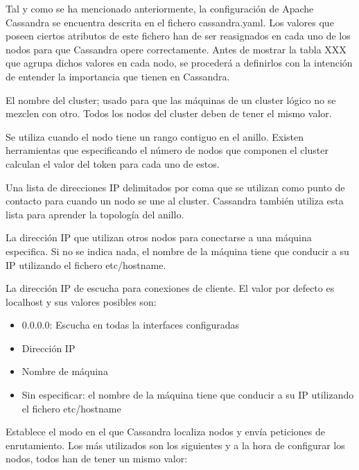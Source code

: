 Tal y como se ha mencionado anteriormente, la configuración de Apache Cassandra se encuentra descrita en el fichero cassandra.yaml. Los valores que poseen ciertos atributos de este fichero han de ser reasignados en cada uno de los nodos para que Cassandra opere correctamente. Antes de mostrar la tabla XXX que agrupa dichos valores en cada nodo, se procederá a definirlos con la intención de entender la importancia que tienen en Cassandra.


El nombre del cluster; usado para que las máquinas de un cluster lógico no se mezclen con otro. Todos los nodos del cluster deben de tener el mismo valor.


Se utiliza cuando el nodo tiene un rango contiguo en el anillo. Existen herramientas que especificando el número de nodos que componen el cluster calculan el valor del token para cada uno de estos.


Una lista de direcciones IP delimitados por coma que se utilizan como punto de contacto para cuando un nodo se une al cluster. Cassandra también utiliza esta lista para aprender la topología del anillo.


La dirección IP que utilizan otros nodos para conectarse a una máquina especifica. Si no se indica nada, el nombre de la máquina tiene que conducir a su IP utilizando el fichero etc/hostname.


La dirección IP de escucha para conexiones de cliente. El valor por defecto es localhost y sus valores posibles son:

\begin{itemize}
	\item 0.0.0.0: Escucha en todas la interfaces configuradas
	\item Dirección IP
	\item Nombre de máquina
	\item Sin especificar: el nombre de la máquina tiene que conducir a su IP utilizando el fichero etc/hostname
\end{itemize}
	

Establece el modo en el que Cassandra localiza nodos y envía peticiones de enrutamiento. Los más utilizados son los siguientes y a la hora de configurar los nodos, todos han de tener un mismo valor:

